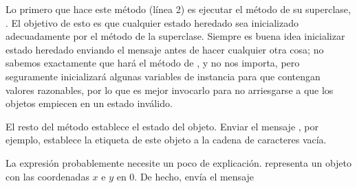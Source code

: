 \documentclass[a4paper,10pt,twoside]{book}
\begin{document}

Lo primero que hace este m\'etodo (l\'inea 2) es ejecutar el m\'etodo  de su superclase, .
El objetivo de esto es que cualquier estado heredado sea inicializado adecuadamente por el m\'etodo  de la superclase.
Siempre es buena idea inicializar estado heredado enviando el mensaje  antes de hacer cualquier otra cosa; no sabemos exactamente que har\'a el m\'etodo  de , y no nos importa, pero seguramente inicializar\'a algunas variables de instancia para que contengan valores razonables, por lo que es mejor invocarlo para no arriesgarse a que los objetos empiecen en un estado inv\'alido.


El resto del m\'etodo establece el estado del objeto.
Enviar el mensaje , por ejemplo, establece la etiqueta de este objeto a la cadena de caracteres vac\'ia.


La expresi\'on  probablemente necesite un poco de explicaci\'on.
 representa un objeto  con las coordenadas $x$ e $y$ en 0.
De hecho,  env\'ia el mensaje 

\end{document}

